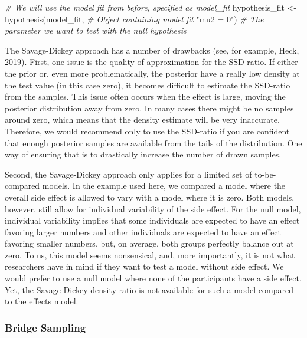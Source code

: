 \documentclass[
  english,
  doc,floatsintext]{apa6}
\newenvironment{Shaded}{\begin{snugshade}}{\end{snugshade}}
\newcommand{\CommentTok}[1]{\textcolor[rgb]{0.56,0.35,0.01}{\textit{#1}}}
\newcommand{\FunctionTok}[1]{\textcolor[rgb]{0.00,0.00,0.00}{#1}}
\newcommand{\NormalTok}[1]{#1}
\newcommand{\OtherTok}[1]{\textcolor[rgb]{0.56,0.35,0.01}{#1}}
\newcommand{\StringTok}[1]{\textcolor[rgb]{0.31,0.60,0.02}{#1}}
\begin{document}
\scriptsize

\begin{Shaded}
\begin{Highlighting}[]
\CommentTok{\# We will use the model fit from before, specified as model\_fit}
\NormalTok{hypothesis\_fit }\OtherTok{\textless{}{-}} \FunctionTok{hypothesis}\NormalTok{(model\_fit,    }\CommentTok{\# Object containing model fit }
                             \StringTok{"mu2 = 0"}\NormalTok{)   }\CommentTok{\# The parameter we want to test with the null hypothesis }
\end{Highlighting}
\end{Shaded}

\normalsize

The Savage-Dickey approach has a number of drawbacks (see, for example, Heck, 2019). First, one issue is the quality of approximation for the SSD-ratio. If either the prior or, even more problematically, the posterior have a really low density at the test value (in this case zero), it becomes difficult to estimate the SSD-ratio from the samples. This issue often occurs when the effect is large, moving the posterior distribution away from zero. In many cases there might be no samples around zero, which means that the density estimate will be very inaccurate. Therefore, we would recommend only to use the SSD-ratio if you are confident that enough posterior samples are available from the tails of the distribution. One way of ensuring that is to drastically increase the number of drawn samples.

Second, the Savage-Dickey approach only applies for a limited set of to-be-compared models. In the example used here, we compared a model where the overall side effect is allowed to vary with a model where it is zero. Both models, however, still allow for individual variability of the side effect. For the null model, individual variability implies that some individuals are expected to have an effect favoring larger numbers and other individuals are expected to have an effect favoring smaller numbers, but, on average, both groups perfectly balance out at zero. To us, this model seems nonsensical, and, more importantly, it is not what researchers have in mind if they want to test a model without side effect. We would prefer to use a null model where none of the participants have a side effect. Yet, the Savage-Dickey density ratio is not available for such a model compared to the effects model.

\hypertarget{bridge-sampling}{%
\subsubsection{Bridge Sampling}\label{bridge-sampling}}
\end{document}
